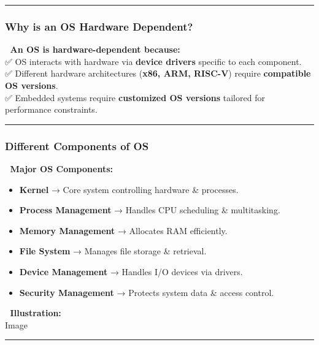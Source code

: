 \documentclass[
]{article}
\providecommand{\tightlist}{%
  \setlength{\itemsep}{0pt}\setlength{\parskip}{0pt}}
\begin{document}
\begin{center}\rule{0.5\linewidth}{0.5pt}\end{center}

\subsubsection{\texorpdfstring{\textbf{Why is an OS Hardware
Dependent?}}{Why is an OS Hardware Dependent?}}\label{why-is-an-os-hardware-dependent}

📌 \textbf{An OS is hardware-dependent because:}\\
✅ OS interacts with hardware via \textbf{device drivers} specific to
each component.\\
✅ Different hardware architectures (\textbf{x86, ARM, RISC-V}) require
\textbf{compatible OS versions}.\\
✅ Embedded systems require \textbf{customized OS versions} tailored for
performance constraints.

\begin{center}\rule{0.5\linewidth}{0.5pt}\end{center}

\subsubsection{\texorpdfstring{\textbf{Different Components of
OS}}{Different Components of OS}}\label{different-components-of-os}

📌 \textbf{Major OS Components:}

\begin{itemize}
\tightlist
\item
  \textbf{Kernel} → Core system controlling hardware \& processes.
\item
  \textbf{Process Management} → Handles CPU scheduling \& multitasking.
\item
  \textbf{Memory Management} → Allocates RAM efficiently.
\item
  \textbf{File System} → Manages file storage \& retrieval.
\item
  \textbf{Device Management} → Handles I/O devices via drivers.
\item
  \textbf{Security Management} → Protects system data \& access control.
\end{itemize}

📌 \textbf{Illustration:}\\
{Image}

\begin{center}\rule{0.5\linewidth}{0.5pt}\end{center}
\end{document}
